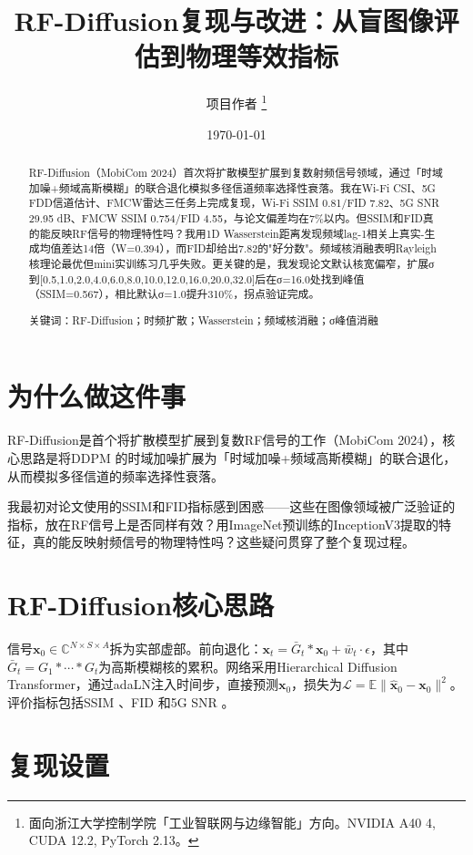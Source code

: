 \documentclass[11pt]{ctexart}
\title{\textbf{RF-Diffusion复现与改进：从盲图像评估到物理等效指标}}
\author{项目作者 \thanks{面向浙江大学控制学院「工业智联网与边缘智能」方向。NVIDIA A40 4, CUDA 12.2, PyTorch 2.13。}}
\date{\today}
\begin{document}
\maketitle

\begin{abstract}
\noindent
RF-Diffusion（MobiCom 2024）首次将扩散模型扩展到复数射频信号领域，通过「时域加噪+频域高斯模糊」的联合退化模拟多径信道频率选择性衰落。我在Wi-Fi CSI、5G FDD信道估计、FMCW雷达三任务上完成复现，Wi-Fi SSIM 0.81/FID 7.82、5G SNR 29.95 dB、FMCW SSIM 0.754/FID 4.55，与论文偏差均在7\%以内。但SSIM和FID真的能反映RF信号的物理特性吗？我用1D Wasserstein距离发现频域lag-1相关上真实-生成均值差达14倍（W=0.394），而FID却给出7.82的"好分数"。频域核消融表明Rayleigh核理论最优但mini实训练习几乎失败。更关键的是，我发现论文默认核宽偏窄，扩展σ到{[}0.5,1.0,2.0,4.0,6.0,8.0,10.0,12.0,16.0,20.0,32.0{]}后在σ=16.0处找到峰值（SSIM=0.567），相比默认σ=1.0提升310\%，拐点验证完成。

关键词：RF-Diffusion；时频扩散；Wasserstein；频域核消融；σ峰值消融
\end{abstract}

\section{为什么做这件事}

RF-Diffusion是首个将扩散模型扩展到复数RF信号的工作（MobiCom 2024），核心思路是将DDPM \cite{ho2020ddpm}的时域加噪扩展为「时域加噪+频域高斯模糊」的联合退化，从而模拟多径信道的频率选择性衰落。

我最初对论文使用的SSIM和FID指标感到困惑——这些在图像领域被广泛验证的指标，放在RF信号上是否同样有效？用ImageNet预训练的InceptionV3提取的特征，真的能反映射频信号的物理特性吗？这些疑问贯穿了整个复现过程。

\section{RF-Diffusion核心思路}

信号$\mathbf{x}_{0}\in\mathbb{C}^{N\times S\times A}$拆为实部虚部。前向退化：$\mathbf{x}_{t}=\bar{G}_{t}*\mathbf{x}_{0}+\bar{w}_{t}\cdot\epsilon$，其中$\bar{G}_{t}=G_{1}*\cdots*G_{t}$为高斯模糊核的累积。网络采用Hierarchical Diffusion Transformer，通过adaLN注入时间步，直接预测$\mathbf{x}_{0}$，损失为$\mathcal{L}=\mathbb{E}\|\hat{\mathbf{x}}_{0}-\mathbf{x}_{0}\|^{2}$。评价指标包括SSIM \cite{wang2004ssim}、FID \cite{heusel2017fid}和5G SNR \cite{chi2024rf}。

\section{复现设置}
\end{document}
